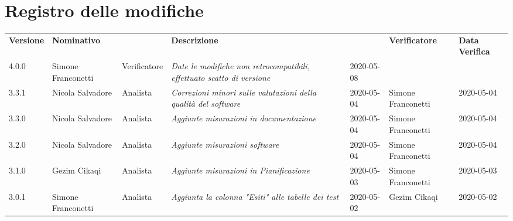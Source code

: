 \section*{Registro delle modifiche}
\renewcommand{\arraystretch}{1.8}
 \setlength\LTleft{-1.7cm}
 \begin{longtable}{|p{1.7cm}|p{2cm}|p{2.5cm}|p{3cm}|p{1.7cm}|p{2cm}|p{2.3cm}|}
  \hline
  \rowcolor{header}
  \textbf{Versione} & \textbf{Nominativo} & \centering{\textbf{Ruolo}} & \textbf{Descrizione} &   \centering{\textbf{Data}} & \textbf{Verificatore} & \textbf{Data Verifica} \\
  
  4.0.0 & Simone Franconetti & Verificatore & \small{\textit{Date le modifiche non retrocompatibili, effettuato scatto di versione}} & 2020-05-08 & &\\  
  3.3.1 & Nicola Salvadore  & Analista & \small{\textit{Correzioni minori sulle valutazioni della qualità del software}} & 2020-05-04 & Simone Franconetti  & 2020-05-04 \\
  3.3.0 & Nicola Salvadore  & Analista & \small{\textit{Aggiunte misurazioni in documentazione}} & 2020-05-04 & Simone Franconetti  & 2020-05-04 \\
  3.2.0 & Nicola Salvadore  & Analista & \small{\textit{Aggiunte misurazioni software}} & 2020-05-04 & Simone Franconetti  & 2020-05-04 \\
  3.1.0 & Gezim Cikaqi  & Analista & \small{\textit{Aggiunte misurazioni in Pianificazione}} & 2020-05-03 & Simone Franconetti  & 2020-05-03 \\
  3.0.1 & Simone Franconetti & Analista & \small{\textit{Aggiunta la colonna "Esiti" alle tabelle dei test}} & 2020-05-02 & Gezim Cikaqi  & 2020-05-02 \\
  

\end{longtable}
